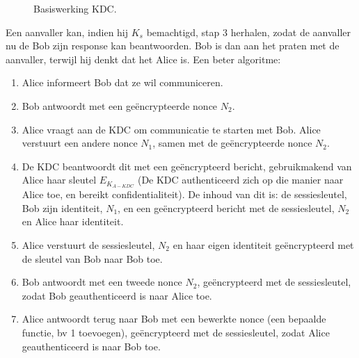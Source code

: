 \documentclass{report}
\begin{document}
	\begin{figure}
		\centering
		\caption{Basiswerking KDC.}
		\label{fig:basiswerkingKDC}
	\end{figure}
	Een aanvaller kan, indien hij $K_s$ bemachtigd, stap 3 herhalen, zodat de aanvaller nu de Bob zijn response kan beantwoorden. Bob is dan aan het praten met de aanvaller, terwijl hij denkt dat het Alice is.
	Een beter algoritme:
	\begin{enumerate}
		\item Alice informeert Bob dat ze wil communiceren.
		\item Bob antwoordt met een geëncrypteerde nonce $N_2$.
		\item Alice vraagt aan de KDC om communicatie te starten met Bob. Alice verstuurt een andere nonce $N_1$, samen met de geëncrypteerde nonce $N_2$.
		\item De KDC beantwoordt dit met een geëncrypteerd bericht, gebruikmakend van Alice haar sleutel $E_{K_{A-KDC}}$ (De KDC authenticeerd zich op die manier naar Alice toe, en bereikt confidentialiteit). De inhoud van dit is: de sessiesleutel, Bob zijn identiteit, $N_1$, en een geëncrypteerd bericht met de sessiesleutel, $N_2$ en Alice haar identiteit.
		\item Alice verstuurt de sessiesleutel, $N_2$ en haar eigen identiteit geëncrypteerd met de sleutel van Bob naar Bob toe.
		\item Bob antwoordt met een tweede nonce $N_2$, geëncrypteerd met de sessiesleutel, zodat Bob geauthenticeerd is naar Alice toe.
		\item Alice antwoordt terug naar Bob met een bewerkte nonce (een bepaalde functie, bv 1 toevoegen), geëncrypteerd met de sessiesleutel, zodat Alice geauthenticeerd is naar Bob toe.
	\end{enumerate}
\end{document}

